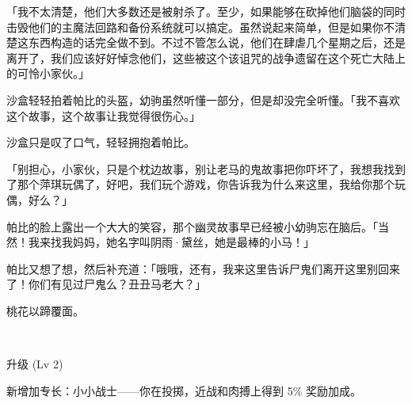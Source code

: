 「我不太清楚，他们大多数还是被射杀了。至少，如果能够在砍掉他们脑袋的同时击毁他们的主魔法回路和备份系统就可以搞定。虽然说起来简单，但是如果你不清楚这东西构造的话完全做不到。不过不管怎么说，他们在肆虐几个星期之后，还是离开了，我们应该好好悼念他们，这些被这个该诅咒的战争遗留在这个死亡大陆上的可怜小家伙。」

沙盒轻轻拍着帕比的头盔，幼驹虽然听懂一部分，但是却没完全听懂。「我不喜欢这个故事，这个故事让我觉得很伤心。」

沙盒只是叹了口气，轻轻拥抱着帕比。

「别担心，小家伙，只是个枕边故事，别让老马的鬼故事把你吓坏了，我想我找到了那个萍琪玩偶了，好吧，我们玩个游戏，你告诉我为什么来这里，我给你那个玩偶，好么？」

帕比的脸上露出一个大大的笑容，那个幽灵故事早已经被小幼驹忘在脑后。「当然！我来找我妈妈，她名字叫阴雨·黛丝，她是最棒的小马！」

帕比又想了想，然后补充道：「哦哦，还有，我来这里告诉尸鬼们离开这里别回来了！你们有见过尸鬼么？丑丑马老大？」

桃花以蹄覆面。

~\vfill

\begin{note}
    升级 (Lv 2)

    新增加专长：小小战士——你在投掷，近战和肉搏上得到 5\% 奖励加成。
\end{note}



